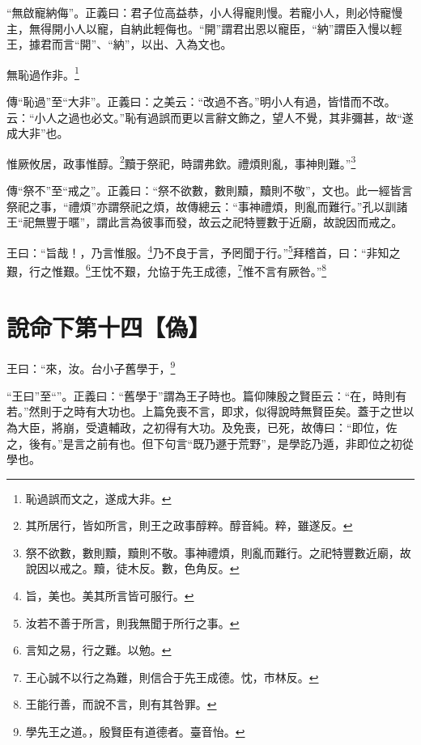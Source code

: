 {\noindent\shu{}\fzkt “無啟寵納侮”。正義曰：君子位高益恭，小人得寵則慢。若寵小人，則必恃寵慢主，無得開小人以寵，自納此輕侮也。“開”謂君出恩以寵臣，“納”謂臣入慢以輕王，據君而言“開”、“納”，以出、入為文也。 \par}

無恥過作非。\footnote{恥過誤而文之，遂成大非。}

{\noindent\zhuan{}\fzbyks 傳“恥過”至“大非”。正義曰：之美云：“改過不吝。”明小人有過，皆惜而不改。云：“小人之過也必文。”恥有過誤而更以言辭文飾之，望人不覺，其非彌甚，故“遂成大非”也。 \par}

惟厥攸居，政事惟醇。\footnote{其所居行，皆如所言，則王之政事醇粹。醇音純。粹，雖遂反。}黷于祭祀，時謂弗欽。禮煩則亂，事神則難。”\footnote{祭不欲數，數則黷，黷則不敬。事神禮煩，則亂而難行。之祀特豐數近廟，故說因以戒之。黷，徒木反。數，色角反。}

{\noindent\zhuan{}\fzbyks 傳“祭不”至“戒之”。正義曰：“祭不欲數，數則黷，黷則不敬”，文也。此一經皆言祭祀之事，“禮煩”亦謂祭祀之煩，故傳總云：“事神禮煩，則亂而難行。”孔以訓諸王“祀無豐于暱”，謂此言為彼事而發，故云之祀特豐數于近廟，故說因而戒之。 \par}

王曰：“旨哉！，乃言惟服。\footnote{旨，美也。美其所言皆可服行。}乃不良于言，予罔聞于行。”\footnote{汝若不善于所言，則我無聞于所行之事。}拜稽首，曰：“非知之艱，行之惟艱。\footnote{言知之易，行之難。以勉。}王忱不艱，允協于先王成德，\footnote{王心誠不以行之為難，則信合于先王成德。忱，市林反。}惟不言有厥咎。”\footnote{王能行善，而說不言，則有其咎罪。}

\section{說命下第十四【偽】}

王曰：“來，汝。台小子舊學于，\footnote{學先王之道。，殷賢臣有道德者。臺音怡。}

{\noindent\shu{}\fzkt “王曰”至“”。正義曰：“舊學于”謂為王子時也。篇仰陳殷之賢臣云：“在，時則有若。”然則于之時有大功也。上篇免喪不言，即求，似得說時無賢臣矣。蓋于之世以為大臣，將崩，受遺輔政，之初得有大功。及免喪，已死，故傳曰：“即位，佐之，後有。”是言之前有也。但下句言“既乃遯于荒野”，是學訖乃遁，非即位之初從學也。 \par}

